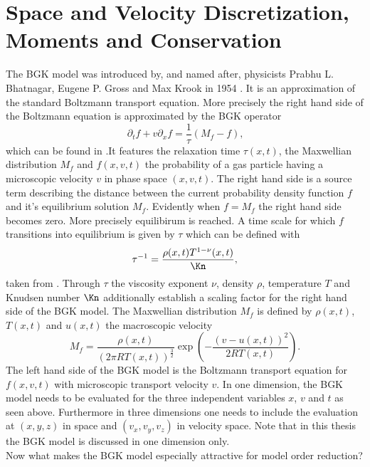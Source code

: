 \section{Space and Velocity Discretization, Moments and Conservation}
The BGK model was introduced by, and named after, physicists Prabhu L. Bhatnagar, Eugene P. Gross and Max Krook in 1954 \cite{BGK}. It is an approximation of the standard Boltzmann transport equation. More precisely the right hand side of the Boltzmann equation is approximated by the BGK operator 
\begin{equation}
\partial_t f + v \partial_x f = \frac{1}{\tau} (M_f - f) \text{,}
\label{Eq:BGK}
\end{equation}
which can be found in \cite{puppo2019kinetic}.It features the relaxation time \(\tau(x,t)\), the Maxwellian distribution \(M_f\) and \(f(x,v,t)\) the probability of a gas particle having a microscopic velocity \(v\) in phase space \((x,v,t)\). The right hand side is a source term describing the distance between the current probability density function \(f\) and it's equilibrium solution \(M_f\). Evidently when \(f = M_f\) the right hand side becomes zero. More precisely equilibirum is reached. A time scale for which \(f\) transitions into equilibrium is given by \(\tau\) which can be defined with
\begin{equation}
	\tau^{-1} = \frac{\rho(x,t)T^{1-\nu}(x,t)}{\Kn}\mathrm{,}
\end{equation}
taken from \cite{Bernard}. Through \(\tau\) the viscosity exponent \(\nu\), density \(\rho\), temperature \(T\) and Knudsen number \(\Kn\) additionally establish a scaling factor for the right hand side of the BGK model. The Maxwellian distribution \(M_f\) is defined by \(\rho(x,t)\), \(T(x,t)\) and \(u(x,t)\) the macroscopic velocity
\begin{equation}
M_f = \frac{\rho(x,t)}{(2\pi R T(x,t))^{\frac{3}{2}}}\exp(-\frac{(v - u(x,t))^2}{2 R T(x,t)}) \text{.}
\end{equation} 
The left hand side of the BGK model is the Boltzmann transport equation for \(f(x,v,t)\) with microscopic transport velocity \(v\).
In one dimension, the BGK model needs to be evaluated for the three independent variables \(x\), \(v\) and \(t\) as seen above. Furthermore in three dimensions one needs to include the evaluation at \((x,y,z)\) in space and \((v_x,v_y,v_z)\) in velocity space. Note that in this thesis the BGK model is discussed in one dimension only.\\ 
Now what makes the BGK model especially attractive for model order reduction?

